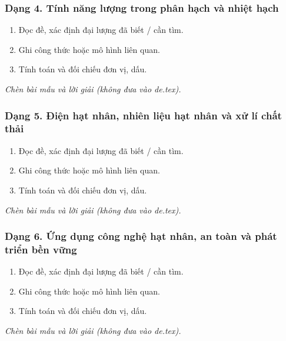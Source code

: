 \subsubsection{Dạng 4. Tính năng lượng trong phân hạch và nhiệt hạch}
\begin{phuongphap}
\begin{enumerate}
\item Đọc đề, xác định đại lượng đã biết / cần tìm.
\item Ghi công thức hoặc mô hình liên quan.
\item Tính toán và đối chiếu đơn vị, dấu.
\end{enumerate}
\end{phuongphap}
\begin{vidumau}
\textit{Chèn bài mẫu và lời giải (không đưa vào de.tex).}
\end{vidumau}

\subsubsection{Dạng 5. Điện hạt nhân, nhiên liệu hạt nhân và xử lí chất thải}
\begin{phuongphap}
\begin{enumerate}
\item Đọc đề, xác định đại lượng đã biết / cần tìm.
\item Ghi công thức hoặc mô hình liên quan.
\item Tính toán và đối chiếu đơn vị, dấu.
\end{enumerate}
\end{phuongphap}
\begin{vidumau}
\textit{Chèn bài mẫu và lời giải (không đưa vào de.tex).}
\end{vidumau}

\subsubsection{Dạng 6. Ứng dụng công nghệ hạt nhân, an toàn và phát triển bền vững}
\begin{phuongphap}
\begin{enumerate}
\item Đọc đề, xác định đại lượng đã biết / cần tìm.
\item Ghi công thức hoặc mô hình liên quan.
\item Tính toán và đối chiếu đơn vị, dấu.
\end{enumerate}
\end{phuongphap}
\begin{vidumau}
\textit{Chèn bài mẫu và lời giải (không đưa vào de.tex).}
\end{vidumau}

